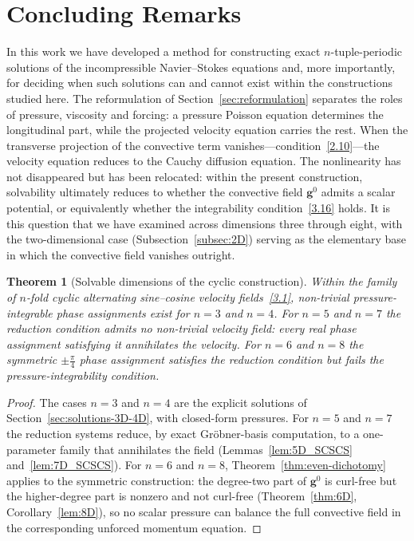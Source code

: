 \documentclass[11pt]{jfm}
\newtheorem{theorem}[lemma]{Theorem}
\numberwithin{equation}{section}
\begin{document}
\section{Concluding Remarks}
\label{sec:conclusion}
In this work we have developed a method for constructing exact $n$-tuple-periodic solutions of
the incompressible Navier--Stokes equations and, more importantly, for deciding when such
solutions can and cannot exist within the constructions studied here. The reformulation of Section~\ref{sec:reformulation} separates the roles of pressure, viscosity and
forcing: a pressure Poisson equation determines the longitudinal part, while the projected velocity
equation carries the rest. When the transverse projection of the convective term
vanishes---condition~\eqref{2.10}---the velocity equation reduces to the Cauchy diffusion
equation. The nonlinearity has not disappeared but has been relocated: within the present
construction, solvability ultimately reduces to whether the convective field
$\boldsymbol{g}^{0}$ admits a scalar potential, or equivalently whether the integrability
condition~\eqref{3.16} holds. It is this question that we have examined across dimensions three
through eight, with the two-dimensional case (Subsection~\ref{subsec:2D}) serving as the elementary base
in which the convective field vanishes outright.

\begin{theorem}[Solvable dimensions of the cyclic construction]
\label{thm:classification}
\label{subsec:solvable}
\label{sec:8D_pattern}
Within the family of $n$-fold cyclic alternating sine--cosine velocity fields~\eqref{3.1},
non-trivial pressure-integrable phase assignments exist for $n=3$ and $n=4$. For $n=5$ and $n=7$
the reduction condition admits no non-trivial velocity field: every real phase assignment
satisfying it annihilates the velocity. For $n=6$ and $n=8$ the symmetric $\pm\tfrac{\pi}{4}$
phase assignment satisfies the reduction condition but fails the pressure-integrability condition.
\end{theorem}

\begin{proof}
The cases $n=3$ and $n=4$ are the explicit solutions of Section~\ref{sec:solutions-3D-4D}, with
closed-form pressures. For $n=5$ and $n=7$ the reduction systems reduce, by exact Gr\"obner-basis
computation, to a one-parameter family that annihilates the field (Lemmas~\ref{lem:5D_SCSCS}
and~\ref{lem:7D_SCSCS}). For $n=6$ and $n=8$, Theorem~\ref{thm:even-dichotomy} applies to the
symmetric construction: the degree-two part of $\boldsymbol{g}^0$ is curl-free but the
higher-degree part is nonzero and not curl-free (Theorem~\ref{thm:6D},
Corollary~\ref{lem:8D}), so no scalar pressure can balance the full convective field in the
corresponding unforced momentum equation.
\end{proof}
\end{document}
